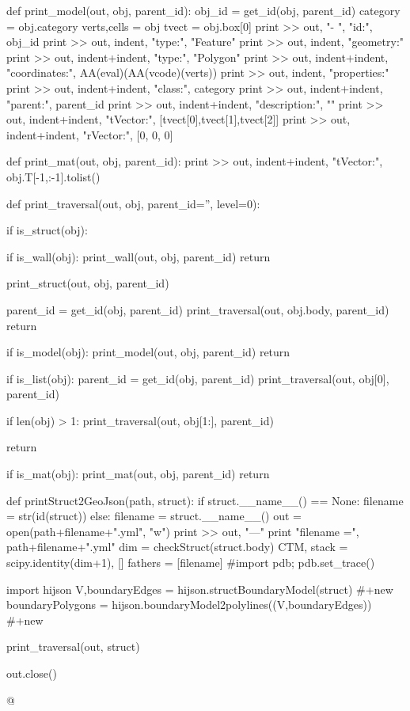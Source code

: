 \documentclass[11pt,oneside]{article}	%
\begin{document}
{def print_model(out, obj, parent_id):
	obj_id = get_id(obj, parent_id)
	category = obj.category
	verts,cells = obj
	tvect = obj.box[0]
	print >> out, "-   ", "id:", obj_id
	print >> out, indent, "type:", "Feature"
	print >> out, indent, "geometry:" 
	print >> out, indent+indent, "type:", "Polygon"
	print >> out, indent+indent, "coordinates:", AA(eval)(AA(vcode)(verts))
	print >> out, indent, "properties:"
	print >> out, indent+indent, "class:", category
	print >> out, indent+indent, "parent:", parent_id
	print >> out, indent+indent, "description:", ""
	print >> out, indent+indent, "tVector:", [tvect[0],tvect[1],tvect[2]]
	print >> out, indent+indent, "rVector:", [0, 0, 0]

def print_mat(out, obj, parent_id):
	print >> out, indent+indent, "tVector:", obj.T[-1,:-1].tolist()


def print_traversal(out, obj, parent_id='', level=0): 

	if is_struct(obj):

		if is_wall(obj):
			print_wall(out, obj, parent_id)
			return

		print_struct(out, obj, parent_id)

		parent_id = get_id(obj, parent_id)
		print_traversal(out, obj.body, parent_id)
		return

	if is_model(obj):
		print_model(out, obj, parent_id)
		return

	if is_list(obj):
		parent_id = get_id(obj, parent_id)      
		print_traversal(out, obj[0], parent_id)
		
		if len(obj) > 1:
			print_traversal(out, obj[1:], parent_id)
	
		return
	
	if is_mat(obj):
		print_mat(out, obj, parent_id)
		return

def printStruct2GeoJson(path, struct):
	if struct.__name__() == None:
		filename = str(id(struct))
	else: 
		filename = struct.__name__()
	out = open(path+filename+".yml", "w")
	print >> out, "---"
	print "filename =", path+filename+".yml"
	dim = checkStruct(struct.body)
	CTM, stack = scipy.identity(dim+1), []
	fathers = [filename]
	#import pdb; pdb.set_trace()

	import hijson
	V,boundaryEdges = hijson.structBoundaryModel(struct)   #+new
	boundaryPolygons = hijson.boundaryModel2polylines((V,boundaryEdges))  #+new
	
	print_traversal(out, struct) 

	out.close()
   
@}
\end{document}
